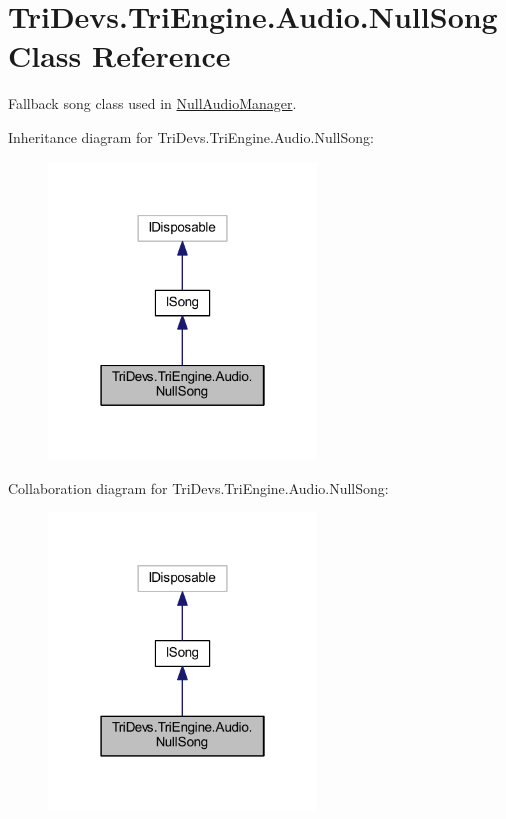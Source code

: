\hypertarget{class_tri_devs_1_1_tri_engine_1_1_audio_1_1_null_song}{\section{Tri\-Devs.\-Tri\-Engine.\-Audio.\-Null\-Song Class Reference}
\label{class_tri_devs_1_1_tri_engine_1_1_audio_1_1_null_song}
}


Fallback song class used in \hyperlink{class_tri_devs_1_1_tri_engine_1_1_audio_1_1_null_audio_manager}{Null\-Audio\-Manager}.  




Inheritance diagram for Tri\-Devs.\-Tri\-Engine.\-Audio.\-Null\-Song\-:
\nopagebreak
\begin{figure}[H]
\begin{center}
\leavevmode
\includegraphics[width=202pt]{class_tri_devs_1_1_tri_engine_1_1_audio_1_1_null_song__inherit__graph}
\end{center}
\end{figure}


Collaboration diagram for Tri\-Devs.\-Tri\-Engine.\-Audio.\-Null\-Song\-:
\nopagebreak
\begin{figure}[H]
\begin{center}
\leavevmode
\includegraphics[width=202pt]{class_tri_devs_1_1_tri_engine_1_1_audio_1_1_null_song__coll__graph}
\end{center}
\end{figure}

